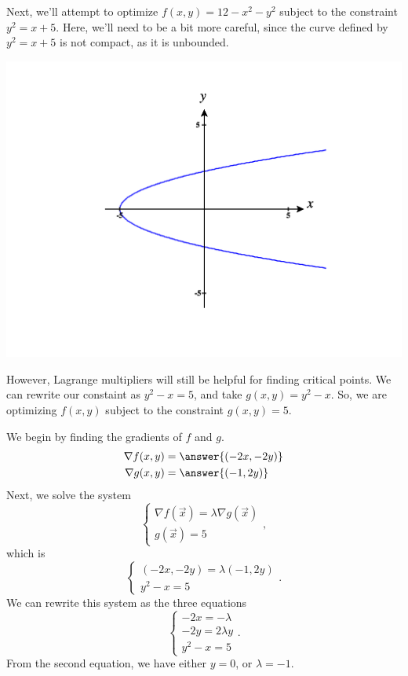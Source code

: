 \documentclass{ximera}
\begin{document}
\begin{example}
Next, we'll attempt to optimize $f(x,y) = 12-x^2-y^2$ subject to the constraint $y^2=x+5$. Here, we'll need to be a bit more careful, since the curve defined by $y^2=x+5$ is not compact, as it is unbounded. 

\begin{image}
\includegraphics[width = \textwidth]{CalcPlot3D-parabola}
\end{image}

However, Lagrange multipliers will still be helpful for finding critical points. We can rewrite our constaint as $y^2-x=5$, and take $g(x,y) = y^2-x$. So, we are optimizing $f(x,y)$ subject to the constraint $g(x,y) = 5$.

We begin by finding the gradients of $f$ and $g$.
\begin{align*}
\nabla f(x,y) &= \answer{(-2x, -2y)}\\
\nabla g(x,y) &= \answer{(-1, 2y)}
\end{align*}
Next, we solve the system
\[\begin{cases}
\nabla f(\vec{x}) = \lambda \nabla g(\vec{x})\\
g(\vec{x}) = 5
\end{cases}, \]
which is
\[\begin{cases}
(-2x,-2y) = \lambda (-1,2y)\\
y^2-x= 5
\end{cases}. \]
We can rewrite this system as the three equations
\[\begin{cases}
-2x = -\lambda\\
-2y = 2\lambda y\\
y^2-x= 5
\end{cases}. \]
From the second equation, we have either $y=0$, or $\lambda =-1$.


\end{example}
\end{document}
